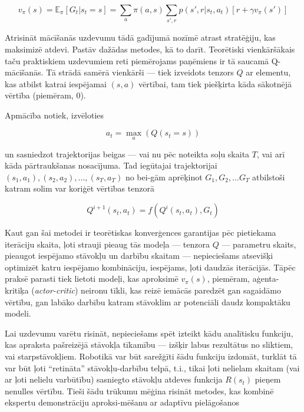 \documentclass[12pt, a4paper]{article}
\numberwithin{equation}{section} %
\begin{document}
\begin{equation}
    v_{\pi}(s) = \mathbb{E}_{\pi}[G_t \vert s_t = s] = \sum_{a}\pi(a,s)\sum_{s', r}p(s', r \vert s_t, a_t)[r + \gamma v_{\pi}(s')]
\end{equation}

Atrisināt mācīšanās uzdevumu tādā gadījumā nozīmē atrast stratēģiju, kas maksimizē atdevi. Pastāv dažādas metodes, kā to darīt. Teorētiski vienkāršākais taču praktiskiem uzdevumiem reti piemērojams paņēmiens ir tā saucamā Q-mācīšanās. Tā strādā samērā vienkārši --- tiek izveidots tenzors $Q$ ar elementu, kas atbilst katrai iespējamai $(s,a)$ vērtībai, tam tiek piešķirta kāda sākotnējā vērtība (piemēram, 0). 

Apmācība notiek, izvēloties

\begin{equation}
    a_t = \max\limits_{a} (Q(s_t = s))
\end{equation}

un sasniedzot trajektorijas beigas --- vai nu pēc noteikta soļu skaita $T$, vai arī kāda pārtraukšanas nosacījuma. Tad iegūtajai trajektorijai $(s_1, a_1), (s_2, a_2), ..., (s_T, a_T)$ no bei-gām aprēķinot $G_1, G_2, ... G_T$ atbilstoši katram solim var koriģēt vērtības tenzorā

\begin{equation}
    Q^{i+1}(s_t,a_t)=f(Q^{i}(s_t, a_t), G_t)
\end{equation}

Kaut gan šai metodei ir teorētiskas konverģences garantijas pēc pietiekama iterāciju skaita, ļoti strauji pieaug tās modeļa --- tenzora $Q$ --- parametru skaits, pieaugot iespējamo stāvokļu un darbību skaitam --- nepieciešams atsevišķi optimizēt katru iespējamo kombināciju, iespējams, ļoti daudzās iterācijās. Tāpēc praksē parasti tiek lietoti modeļi, kas aproksimē $v_{\pi}(s)$, piemēram, aģenta-kritiķa (\textit{actor-critic}) neironu tīkli, kas reizē iemācās paredzēt gan sagaidāmo vērtību, gan labāko darbību katram stāvoklim ar potenciāli daudz kompaktāku modeli.

Lai uzdevumu varētu risināt, nepieciešams spēt izteikt kādu analītisku funkciju, kas apraksta pašreizējā stāvokļa tīkamību --- izšķir labus rezultātus no sliktiem, vai starpstāvokļiem. Robotikā var būt sarežģīti šādu funkciju izdomāt, turklāt tā var būt ļoti ``retināta'' stāvokļu-darbību telpā, t.i., tikai ļoti nelielam skaitam (vai ar ļoti nelielu varbūtību) sasniegto stāvokļu atdeves funkcija $R(s_t)$ pieņem nenulles vērtību. Tieši šādu trūkumu mēģina risināt metodes, kas kombinē ekspertu demonstrāciju aproksi-mēšanu ar adaptīvu pielāgošanos\cite{nair2018overcoming}
\end{document}
